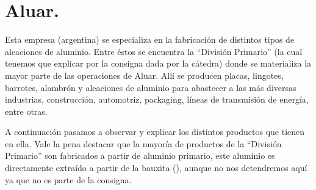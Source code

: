 \documentclass[12pt,a4paper]{article}
\begin{document}

\newpage
\tableofcontents

\begin{abstract}
   Analice e investigue el contenido del catálogo que se indica a fin de adquirir la capacidad de explicar el significado de la información que allí se detalla:
   \begin{itemize}
    \item Aluar. Sitio Web: \url{https://www.aluar.com.ar/}.
    \item Alacer Mas. Propiedades del aluminio barra y chapa. Sitio Web: \url{https://www.alacermas.com/es/categoria/acero-inoxidable?categoria=82&gama=82&producto=832&subcateg%20%20oria=230}. [NOTA: Se publican varias hojas técnicas con caracterización del producto].
    \item Sanmetal. Productos de Aleaciones de Bronces y Cobres. Sitio Web: \url{https://www.sanmetal.es/docs/SANMETAL_BRONCE.pdf}.
    \item CEMBRASS. Catálogo de Productos. Sitio Web: \url{https://www.cembrass.com.ar//wp/wp-content/uploads/pdf/brochure.pdf}.
    \item OMAMET. Tabla de aleaciones. Sitio Web: .
    \item KNIGHT GROUP. Sitio Web: \url{https://www.knight-group.co.uk/wp-content/uploads/Brochures/QR159%20Knight%20Group%20Copper%20and%20Bronzes%20Brochure.pdf}.
   \end{itemize}
\end{abstract}

\section{Aluar.}

Esta empresa (argentina) se especializa en la fabricación de distintos tipos de aleaciones de aluminio. Entre éstos se encuentra la \enquote{División Primario} (la cual tenemos que explicar por la consigna dada por la cátedra) donde se materializa la mayor parte de las operaciones de Aluar. Allí se producen placas, lingotes, barrotes, alambrón y aleaciones de aluminio para abastecer a las más diversas industrias, construcción, automotriz, packaging, líneas de transmisión de energía, entre otras.

A continuación pasamos a observar y explicar los distintos productos que tienen en ella. Vale la pena destacar que la mayoría de productos de la \enquote{División Primario} son fabricados a partir de aluminio primario, este aluminio es directamente extraído a partir de la bauxita (), aunque no nos detendremos aquí ya que no es parte de la consigna.
\end{document}
